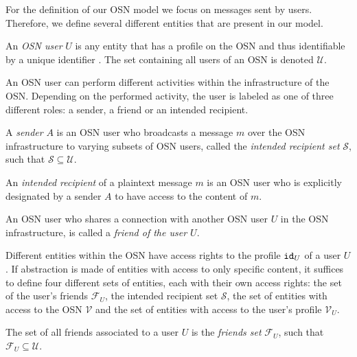 For the definition of our OSN model we focus on messages sent by users. Therefore, we define several different entities that are present in our model.

\begin{defn}
\label{def:user}
 An \textit{OSN user} $U$ is any entity that has a profile on the OSN and thus identifiable by a unique identifier . The set containing all users of an OSN is denoted $\mathcal{U}$.
\end{defn}

An OSN user can perform different activities within the infrastructure of the OSN. Depending on the performed activity, the user is labeled as one of three different roles: a sender, a friend or an intended recipient.

\begin{defn}[Sender]
\label{def:sender}
 A \textit{sender} $A$ is an OSN user who broadcasts a message $m$ over the OSN infrastructure to varying subsets of OSN users, called the \textit{intended recipient set} $\mathcal{S}$, such that $\mathcal{S} \subseteq \mathcal{U}$.
\end{defn}

\begin{defn}
\label{def:recipient}
 An \textit{intended recipient} of a plaintext message $m$ is an OSN user who is explicitly designated by a sender $A$ to have access to the content of $m$.
\end{defn}

\begin{defn}[Friend]
\label{def:friend}
 An OSN user who shares a connection with another OSN user $U$ in the OSN infrastructure, is called a \textit{friend of the user $U$}.
\end{defn}

Different entities within the OSN have access rights to the profile $\mathtt{id}_{U}$ of a user $U$. If abstraction is made of entities with access to only specific content, it suffices to define four different sets of entities, each with their own access rights: the set of the user's friends $\mathcal{F}_U$, the intended recipient set $\mathcal{S}$, the set of entities with access to the OSN $\mathcal{V}$ and the set of entities with access to the user's profile $\mathcal{V}_U$.

\begin{defn}
\label{def:friends_set}
 The set of all friends associated to a user $U$ is the \textit{friends set} $\mathcal{F}_U$, such that $\mathcal{F}_U \subseteq \mathcal{U}$.
\end{defn}

